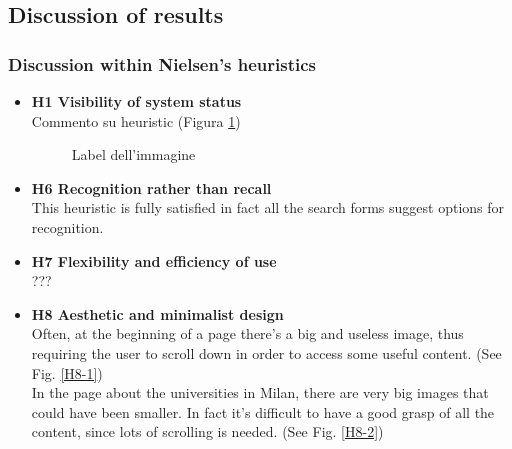 \pagebreak

\subsection{Discussion of results}
\subsubsection{Discussion within Nielsen's heuristics}
\begin{itemize}
    \item \textbf{H1 Visibility of system status}\\
    Commento su heuristic (Figura \ref{fig:1-image-ref})
    \begin{figure}[!ht]
        \begin{minipage}{\linewidth}
            \centering
            \captionsetup{justification=centering}
            \caption{Label dell'immagine}
            \label{fig:1-image-ref}
        \end{minipage}
    \end{figure}
    \item \textbf{H6 Recognition rather than recall}\\
    This heuristic is fully satisfied in fact all the search forms suggest options for recognition.
    \item \textbf{H7 Flexibility and efficiency of use}\\
    ???
    \item \textbf{H8 Aesthetic and minimalist design}\\
    Often, at the beginning of a page there's a big and useless image, thus requiring the user to scroll down in order to access some useful content. (See Fig. \ref{H8-1})\\
    In the page about the universities in Milan, there are very big images that could have been smaller. In fact it's difficult to have a good grasp of all the content, since lots of scrolling is needed. (See Fig. \ref{H8-2})
\begin{figure}[!ht]
            \begin{minipage}{\linewidth}

\end{minipage}
\end{figure}
\end{itemize}
